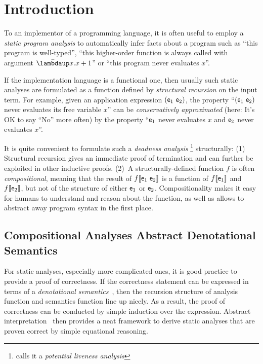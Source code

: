\section{Introduction}
\label{sec:introduction}

To an implementor of a programming language, it is often useful to employ a
\emph{static program analysis} to automatically infer facts about a program such
as ``this program is well-typed'', ``this higher-order function is always called
with argument $\Lam{x}{x+1}$'' or ``this program never evaluates $x$''.

If the implementation language is a functional one, then usually such static
analyses are formulated as a function defined by \emph{structural recursion} on
the input term.
For example, given an application expression $(\mathsf{e}_1~\mathsf{e}_2)$,
the property ``$(\mathsf{e}_1~\mathsf{e}_2)$ never evaluates its free variable $x$'' can be
\emph{conservatively approximated} (here: It's OK to say ``No'' more often) by
the property ``$\mathsf{e}_1$ never evaluates $x$ and $\mathsf{e}_2$ never evaluates
$x$''.

It is quite convenient to formulate such a \emph{deadness analysis}%
\footnote{\citet{Cousot:21} calls it a \emph{potential liveness analysis}}
structurally:
(1) Structural recursion gives an immediate proof of termination and can
    further be exploited in other inductive proofs.
(2)~A structurally-defined function $f$ is often \emph{compositional}, meaning that
    the result of $f\llbracket {\mathsf{e}_1~\mathsf{e}_2} \rrbracket$ is a function of $f\llbracket {\mathsf{e}_1} \rrbracket$ and
    $f\llbracket {\mathsf{e}_2} \rrbracket$, but not of the structure of either $\mathsf{e}_1$ or $\mathsf{e}_2$.
    Compositionality makes it easy for humans to understand and reason about the
    function, as well as allows to abstract away program syntax in the first
    place.

\subsection{Compositional Analyses Abstract Denotational Semantics}

For static analyses, especially more complicated ones, it is good practice to
provide a proof of correctness.
If the correctness statement can be expressed in terms of a \emph{denotational
semantics}~\citep{ScottStrachey:71}, then the recursion structure of analysis
function and semantics function line up nicely.
As a result, the proof of correctness can be conducted by simple induction
over the expression. Abstract interpretation~\citep{Cousot:21} then provides
a neat framework to derive static analyses that are proven correct by simple
equational reasoning.

